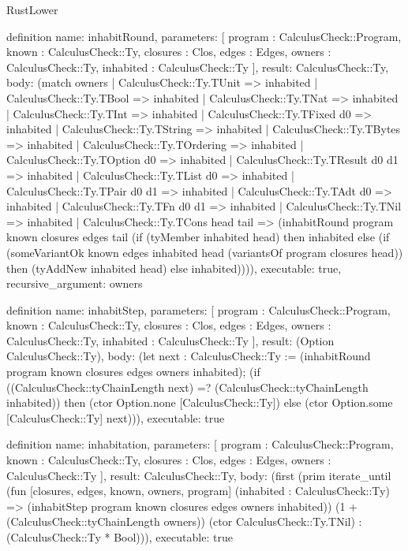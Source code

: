\begin{lexlean}{RustLower}
\begin{semanticmodule}
definition{
  name: inhabitRound,
  parameters: [
    program : CalculusCheck::Program,
    known : CalculusCheck::Ty,
    closures : Clos,
    edges : Edges,
    owners : CalculusCheck::Ty,
    inhabited : CalculusCheck::Ty
  ],
  result: CalculusCheck::Ty,
  body: (match owners
    | CalculusCheck::Ty.TUnit => inhabited
    | CalculusCheck::Ty.TBool => inhabited
    | CalculusCheck::Ty.TNat => inhabited
    | CalculusCheck::Ty.TInt => inhabited
    | CalculusCheck::Ty.TFixed d0 => inhabited
    | CalculusCheck::Ty.TString => inhabited
    | CalculusCheck::Ty.TBytes => inhabited
    | CalculusCheck::Ty.TOrdering => inhabited
    | CalculusCheck::Ty.TOption d0 => inhabited
    | CalculusCheck::Ty.TResult d0 d1 => inhabited
    | CalculusCheck::Ty.TList d0 => inhabited
    | CalculusCheck::Ty.TPair d0 d1 => inhabited
    | CalculusCheck::Ty.TAdt d0 => inhabited
    | CalculusCheck::Ty.TFn d0 d1 => inhabited
    | CalculusCheck::Ty.TNil => inhabited
    | CalculusCheck::Ty.TCons head tail => (inhabitRound program known closures edges tail (if (tyMember inhabited head) then inhabited else (if (someVariantOk known edges inhabited head (variantsOf program closures head)) then (tyAddNew inhabited head) else inhabited)))),
  executable: true,
  recursive_argument: owners
}

definition{
  name: inhabitStep,
  parameters: [
    program : CalculusCheck::Program,
    known : CalculusCheck::Ty,
    closures : Clos,
    edges : Edges,
    owners : CalculusCheck::Ty,
    inhabited : CalculusCheck::Ty
  ],
  result: (Option CalculusCheck::Ty),
  body: (let next : CalculusCheck::Ty := (inhabitRound program known closures edges owners inhabited); (if ((CalculusCheck::tyChainLength next) =? (CalculusCheck::tyChainLength inhabited)) then (ctor Option.none [CalculusCheck::Ty]) else (ctor Option.some [CalculusCheck::Ty] next))),
  executable: true
}

definition{
  name: inhabitation,
  parameters: [
    program : CalculusCheck::Program,
    known : CalculusCheck::Ty,
    closures : Clos,
    edges : Edges,
    owners : CalculusCheck::Ty
  ],
  result: CalculusCheck::Ty,
  body: (first (prim iterate_until (fun [closures, edges, known, owners, program] (inhabited : CalculusCheck::Ty) => (inhabitStep program known closures edges owners inhabited)) (1 + (CalculusCheck::tyChainLength owners)) (ctor CalculusCheck::Ty.TNil) : (CalculusCheck::Ty * Bool))),
  executable: true
}


\end{semanticmodule}
\end{lexlean}

